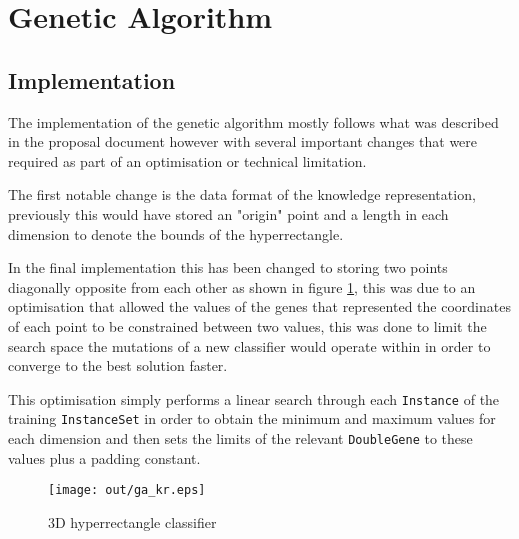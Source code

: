 \documentclass[a4paper]{article}
\title{\DOCTITLE}
\author{\DOCAUTHOR}
\date{\DOCDATE}
\begin{document}
\maketitle

\begin{abstract}
  This report will give an overview of the two nature inspired algorithms that
  were implemented to solve the classification problem, how they differ from
  what was outlined in the proposal and a critical evaluation between the
  performance of both in terms of learning time and classification accuracy.
\end{abstract}

\section{Genetic Algorithm}
\label{sec:ga}

\subsection{Implementation}
\label{sec:ga_implementation}

The implementation of the genetic algorithm mostly follows what was described in
the proposal document however with several important changes that were required
as part of an optimisation or technical limitation.

The first notable change is the data format of the knowledge representation,
previously this would have stored an "origin" point and a length in each
dimension to denote the bounds of the hyperrectangle.

In the final implementation this has been changed to storing two points
diagonally opposite from each other as shown in figure \ref{fig:ga_kr}, this was
due to an optimisation that allowed the values of the genes that represented the
coordinates of each point to be constrained between two values, this was done to
limit the search space the mutations of a new classifier would operate within in
order to converge to the best solution faster.

This optimisation simply performs a linear search through each \texttt{Instance}
of the training \texttt{InstanceSet} in order to obtain the minimum and maximum
values for each dimension and then sets the limits of the relevant
\texttt{DoubleGene} to these values plus a padding constant.

\begin{figure}[h!]
  \centering
  \texttt{[image: out/ga\_kr.eps]}
  \caption{3D hyperrectangle classifier}
  \label{fig:ga_kr}
\end{figure}
\end{document}
